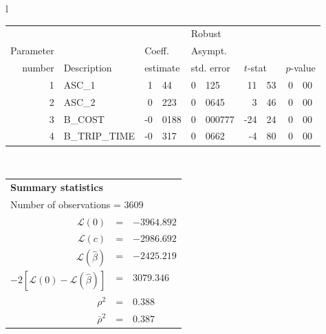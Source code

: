   \begin{tabular}{l}
\begin{tabular}{rlr@{.}lr@{.}lr@{.}lr@{.}l}
         &                       &   \multicolumn{2}{l}{}    & \multicolumn{2}{l}{Robust}  &     \multicolumn{4}{l}{}   \\
Parameter &                       &   \multicolumn{2}{l}{Coeff.}      & \multicolumn{2}{l}{Asympt.}  &     \multicolumn{4}{l}{}   \\
number &  Description                     &   \multicolumn{2}{l}{estimate}      & \multicolumn{2}{l}{std. error}  &   \multicolumn{2}{l}{$t$-stat}  &   \multicolumn{2}{l}{$p$-value}   \\

\hline

1 & ASC\_1 & 1&44 & 0&125 & 11&53 & 0&00 \\
2 & ASC\_2 & 0&223 & 0&0645 & 3&46 & 0&00 \\
3 & B\_COST & -0&0188 & 0&000777 & -24&24 & 0&00 \\
4 & B\_TRIP\_TIME & -0&317 & 0&0662 & -4&80 & 0&00 \\
\hline

\end{tabular}
\\
\begin{tabular}{rcl}
\multicolumn{3}{l}{\bf Summary statistics}\\
\multicolumn{3}{l}{ Number of observations = $3609$} \\
 $\mathcal{L}(0)$ &=&  $-3964.892$ \\
 $\mathcal{L}(c)$ &=& $-2986.692$\\
 $\mathcal{L}(\hat{\beta})$ &=& $-2425.219 $  \\
 $-2[\mathcal{L}(0) -\mathcal{L}(\hat{\beta})]$ &=& $3079.346$ \\
    $\rho^2$ &=&   $0.388$ \\
    $\bar{\rho}^2$ &=&    $0.387$ \\
\end{tabular}
\end{tabular}

